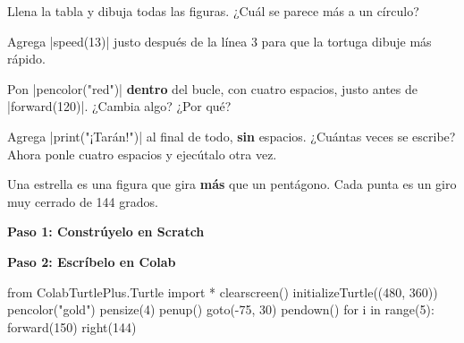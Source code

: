 \begin{challenge}
\tick Llena la tabla y dibuja todas las figuras. ¿Cuál se parece más a un círculo?\par
\tick Agrega \py|speed(13)| justo después de la línea 3 para que la tortuga dibuje más rápido.\par
\tick Pon \py|pencolor("red")| \textbf{dentro} del bucle, con cuatro espacios, justo antes de \py|forward(120)|. ¿Cambia algo? ¿Por qué?\par
\tick Agrega \py|print("¡Tarán!")| al final de todo, \textbf{sin} espacios. ¿Cuántas veces se escribe? Ahora ponle cuatro espacios y ejecútalo otra vez.
\end{challenge}



Una estrella es una figura que gira \textbf{más} que un pentágono. Cada punta es un giro muy cerrado de 144 grados.

\begin{tcbraster}[raster columns=2, raster column skip=12pt, raster valign=top, raster force size=false,
  raster column 1/.style={add to width=-2.0cm}, raster column 2/.style={add to width=2.0cm}]
\begin{tcolorbox}[blankest]{\normalsize\bfseries\color{ink}Paso 1: Constrúyelo en Scratch}\end{tcolorbox}
\begin{tcolorbox}[blankest]{\normalsize\bfseries\color{ink}Paso 2: Escríbelo en Colab}\end{tcolorbox}
\begin{tcolorbox}[blankest]
\begin{scratch}[scale=0.75]
\end{scratch}
\end{tcolorbox}
\begin{typethis}
from ColabTurtlePlus.Turtle import *
clearscreen()
initializeTurtle((480, 360))
pencolor("gold")
pensize(4)
penup()
goto(-75, 30)
pendown()
for i in range(5):
    forward(150)
    right(144)
\end{typethis}
\end{tcbraster}


